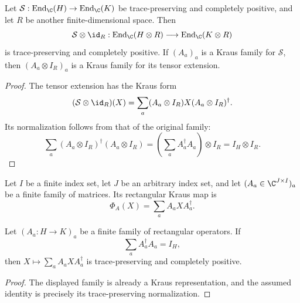 \begin{theorem}
    \label{thm:mpdo_tensor_map_id_cptp}
    \leanok
    Let $\mathcal S:\operatorname{End}_{\C}(H)\to
        \operatorname{End}_{\C}(K)$ be trace-preserving and completely positive,
    and let $R$ be another finite-dimensional space. Then
    \[
        \mathcal S\otimes\id_R:
        \operatorname{End}_{\C}(H\otimes R)\longrightarrow
        \operatorname{End}_{\C}(K\otimes R)
    \]
    is trace-preserving and completely positive. If $(A_a)_a$ is a Kraus
    family for $\mathcal S$, then
    $(A_a\otimes I_R)_a$ is a Kraus family for its tensor extension.
\end{theorem}
\begin{proof}
    \leanok
    The tensor extension has the Kraus form
    \[
        (\mathcal S\otimes\id_R)(X)
        =\sum_a (A_a\otimes I_R)X(A_a\otimes I_R)^\dagger.
    \]
    Its normalization follows from that of the original family:
    \[
        \sum_a (A_a\otimes I_R)^\dagger(A_a\otimes I_R)
        =\left(\sum_a A_a^\dagger A_a\right)\otimes I_R
        =I_H\otimes I_R.
    \]
\end{proof}

\begin{definition}
    \label{def:mpdo_rectangular_kraus_map}
    \leanok
    Let $I$ be a finite index set, let $J$ be an arbitrary index set, and let
    $(A_a\in\C^{J\times I})_a$ be a finite family of matrices. Its
    rectangular Kraus map is
    \[
        \Phi_A(X)=\sum_a A_aXA_a^{\dagger}.
    \]
\end{definition}

\begin{theorem}
    \label{thm:mpdo_rectangular_kraus_map_cptp}
    \leanok
    Let $(A_a:H\to K)_a$ be a finite family of rectangular operators. If
    \[
        \sum_a A_a^\dagger A_a=I_H,
    \]
    then $X\mapsto\sum_a A_aXA_a^\dagger$ is trace-preserving and completely
    positive.
\end{theorem}
\begin{proof}\leanok
    The displayed family is already a Kraus representation, and the assumed
    identity is precisely its trace-preserving normalization.
\end{proof}

